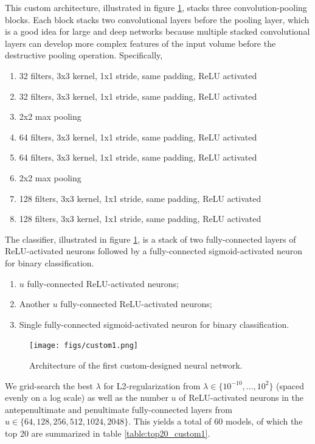 This custom architecture, illustrated in figure \ref{fig:custom1}, stacks three convolution-pooling blocks. Each block stacks two convolutional layers before the pooling layer, which is a good idea for large and deep networks because multiple stacked convolutional layers can develop more complex features of the input volume before the destructive pooling operation. Specifically,

\begin{enumerate}
    \item 32 filters, 3x3 kernel, 1x1 stride, same padding, ReLU activated
    \item 32 filters, 3x3 kernel, 1x1 stride, same padding, ReLU activated
    \item 2x2 max pooling
    \item 64 filters, 3x3 kernel, 1x1 stride, same padding, ReLU activated
    \item 64 filters, 3x3 kernel, 1x1 stride, same padding, ReLU activated
    \item 2x2 max pooling
    \item 128 filters, 3x3 kernel, 1x1 stride, same padding, ReLU activated
    \item 128 filters, 3x3 kernel, 1x1 stride, same padding, ReLU activated
\end{enumerate}

The classifier, illustrated in figure \ref{fig:custom1}, is a stack of two fully-connected layers of ReLU-activated neurons followed by a fully-connected sigmoid-activated neuron for binary classification.

\begin{enumerate}
    \item $u$ fully-connected ReLU-activated neurons;
    \item Another $u$ fully-connected ReLU-activated neurons;
    \item Single fully-connected sigmoid-activated neuron for binary classification.
\end{enumerate}

\begin{figure}[ht]
    \centering
    \texttt{[image: figs/custom1.png]}
    \caption{Architecture of the first custom-designed neural network.}
    \label{fig:custom1}
\end{figure}

We grid-search the best $\lambda$ for L2-regularization from $\lambda \in \{10^{-10}, ..., 10^{2}\}$ (spaced evenly on a log scale) as well as the number $u$ of ReLU-activated neurons in the antepenultimate and penultimate fully-connected layers from $u \in \{ 64, 128, 256, 512, 1024, 2048 \}$. This yields a total of $60$ models, of which the top 20 are summarized in table \ref{table:top20_custom1}.

